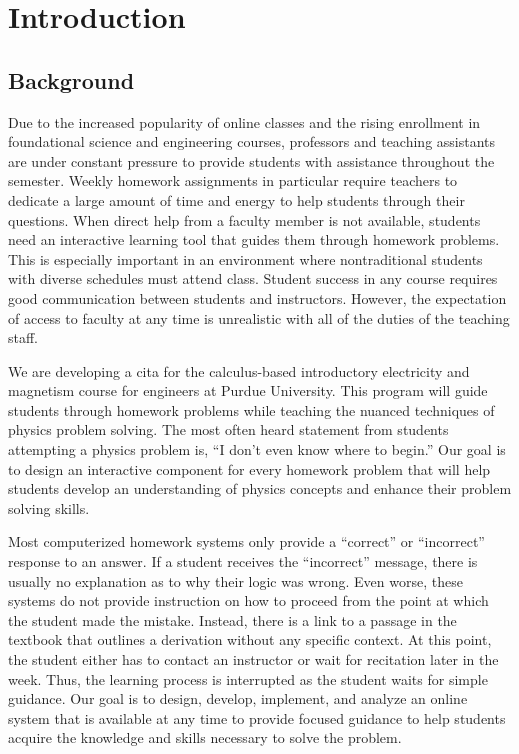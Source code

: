 \chapter[Introduction]{Introduction}

\section{Background}

Due to the increased popularity of online classes and the rising enrollment in foundational science and engineering courses, professors and teaching assistants are under constant pressure to provide students with assistance throughout the semester. Weekly homework assignments in particular require teachers to dedicate a large amount of time and energy to help students through their questions. When direct help from a faculty member is not available, students need an interactive learning tool that guides them through homework problems. This is especially important in an environment where nontraditional students with diverse schedules must attend class\cite{choy2002, horn1996}. Student success in any course requires good communication between students and instructors. However, the expectation of access to faculty at any time is unrealistic with all of the duties of the teaching staff.

We are developing a \gls{cita} for the calculus-based introductory electricity and magnetism course for engineers at Purdue University. This program will guide students through homework problems while teaching the nuanced techniques of physics problem solving. The most often heard statement from students attempting a physics problem is, ``I don’t even know where to begin.'' Our goal is to design an interactive component for every homework problem that will help students develop an understanding of physics concepts and enhance their problem solving skills.

Most computerized homework systems only provide a ``correct'' or ``incorrect'' response to an answer. If a student receives the ``incorrect'' message, there is usually no explanation as to why their logic was wrong. Even worse, these systems do not provide instruction on how to proceed from the point at which the student made the mistake. Instead, there is a link to a passage in the textbook that outlines a derivation without any specific context. At this point, the student either has to contact an instructor or wait for recitation later in the week. Thus, the learning process is interrupted as the student waits for simple guidance. Our goal is to design, develop, implement, and analyze an online system that is available at any time to provide focused guidance to help students acquire the knowledge and skills necessary to solve the problem.

